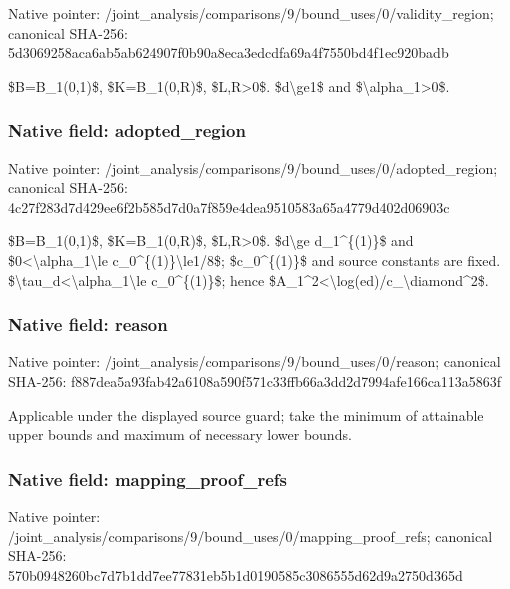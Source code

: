 \documentclass[10pt,a4paper]{article}
\begin{document}
Native pointer: /joint\_analysis/comparis\allowbreak{}ons/9/bound\_uses/0/valid\allowbreak{}ity\_region; canonical SHA-256: 5d3069258aca6ab5ab624907\allowbreak{}f0b90a8eca3edcdfa69a4f75\allowbreak{}50bd4f1ec920badb


\$B=B\_1(0,1)\$, \$K=B\_1(0,R)\$, \$L,R>0\$. \$d\textbackslash{}ge1\$ and \$\textbackslash{}alpha\_1>0\$.


\subsubsection{Native field: adopted\_region}


Native pointer: /joint\_analysis/comparis\allowbreak{}ons/9/bound\_uses/0/adopt\allowbreak{}ed\_region; canonical SHA-256: 4c27f283d7d429ee6f2b585d\allowbreak{}7d0a7f859e4dea9510583a65\allowbreak{}a4779d402d06903c


\$B=B\_1(0,1)\$, \$K=B\_1(0,R)\$, \$L,R>0\$. \$d\textbackslash{}ge d\_1\textasciicircum{}\{(1)\}\$ and \$0<\textbackslash{}alpha\_1\textbackslash{}le c\_0\textasciicircum{}\{(1)\}\textbackslash{}le1/8\$; \$c\_0\textasciicircum{}\{(1)\}\$ and source constants are fixed. \$\textbackslash{}tau\_d<\textbackslash{}alpha\_1\textbackslash{}le c\_0\textasciicircum{}\{(1)\}\$; hence \$A\_1\textasciicircum{}2<\textbackslash{}log(ed)/c\_\textbackslash{}diamond\textasciicircum{}2\$.


\subsubsection{Native field: reason}


Native pointer: /joint\_analysis/comparis\allowbreak{}ons/9/bound\_uses/0/reaso\allowbreak{}n; canonical SHA-256: f887dea5a93fab42a6108a59\allowbreak{}0f571c33ffb66a3dd2d7994a\allowbreak{}fe166ca113a5863f


Applicable under the displayed source guard; take the minimum of attainable upper bounds and maximum of necessary lower bounds.


\subsubsection{Native field: mapping\_proof\_refs}


Native pointer: /joint\_analysis/comparis\allowbreak{}ons/9/bound\_uses/0/mappi\allowbreak{}ng\_proof\_refs; canonical SHA-256: 570b0948260bc7d7b1dd7ee7\allowbreak{}7831eb5b1d0190585c308655\allowbreak{}5d62d9a2750d365d
\end{document}
